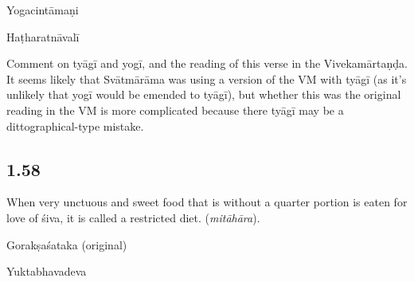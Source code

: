 \begin{ekdosis}
\begin{testimonia}[hp01_057]
Yogacintāmaṇi

\begin{versinnote}
\end{versinnote}

Haṭharatnāvalī

\begin{versinnote}
\end{versinnote}

\end{testimonia}

\begin{philcomm}[hp01_057]
Comment on tyāgī and yogī, and the reading of this verse in the Vivekamārtaṇḍa. It seems likely that Svātmārāma was using a version of the VM with tyāgī (as it’s unlikely that yogī would be emended to tyāgī), but whether this was the original reading in the VM is more complicated because there tyāgī may be a dittographical-type mistake. 
\end{philcomm}

\subsection*{1.58}
\begin{translation}[hp01_058]
When very unctuous and sweet food that is without a quarter portion is eaten for love of śiva, it is called a restricted diet. (\emph{mitāhāra}).
\end{translation}

\begin{sources}[hp01_058]
Gorakṣaśataka (original)

\begin{versinnote}
\end{versinnote}

\end{sources}

\begin{testimonia}[hp01_058]
Yuktabhavadeva


\end{testimonia}
\end{ekdosis}
